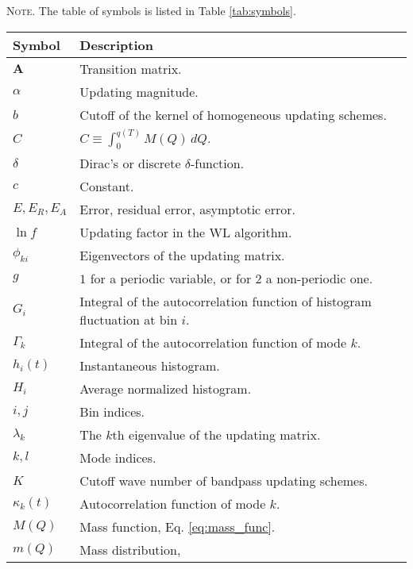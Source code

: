 \documentclass[reprint, superscriptaddress, floatfix]{revtex4-1}
\newcommand{\note}[1]{{\color{DarkGreen}\footnotesize \textsc{Note.} #1}}
\newcommand{\Err}{E}
\begin{document}
\note{The table of symbols is listed in Table \ref{tab:symbols}.
  \begin{table*}
  \footnotesize
  \centering
  \rowcolors{1}{white}{LightGray}
  \setlength{\tabcolsep}{4pt} %
  \caption{\label{tab:symbols}
    Table of symbols.}
  \begin{tabular}{l | p{12cm} }
    Symbol          &   Description \\
    \hline
    $\mathbf{A}$    &   Transition matrix. \\
    $\alpha$        &   Updating magnitude. \\
    $b$             &   Cutoff of the kernel of homogeneous updating schemes. \\
    $C$             &   $C \equiv \int_0^{ q(T) } M(Q) \, dQ$.  \\
    $\delta$        &   Dirac's or discrete $\delta$-function. \\
    $c$             &   Constant. \\
    $\Err, \Err_R, \Err_A$          &   Error, residual error, asymptotic error. \\
    $\ln f$         &   Updating factor in the WL algorithm.  \\
    $\phi_{ki}$     &   Eigenvectors of the updating matrix. \\
    $g$             &   $1$ for a periodic variable, or for $2$ a non-periodic one. \\
    $G_i$           &   Integral of the autocorrelation function of histogram fluctuation at bin $i$. \\
    $\Gamma_k$      &   Integral of the autocorrelation function of mode $k$. \\
    $h_i(t)$        &   Instantaneous histogram.  \\
    $H_i$           &   Average normalized histogram.  \\
    $i, j$          &   Bin indices. \\
    $\lambda_k$     &   The $k$th eigenvalue of the updating matrix. \\
    $k, l$          &   Mode indices. \\
    $K$             &   Cutoff wave number of bandpass updating schemes.  \\
    $\kappa_k(t)$   &   Autocorrelation function of mode $k$. \\
    $M(Q)$          &   Mass function, Eq. \eqref{eq:mass_func}.   \\
    $m(Q)$          &   Mass distribution,

\end{tabular}
\end{table*}}
\end{document}
